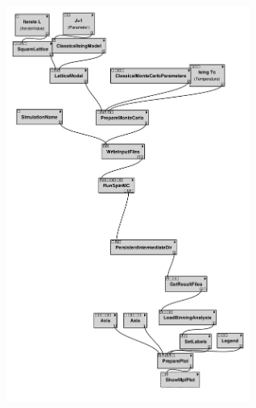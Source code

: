 \href{http://alps.comp-phys.org/vistrails/download.php?getvt=2&db=tutorials&host=alps.ethz.ch&port=3306&tag=&execute=False&showspreadsheetonly=False&version=225}{\includegraphics[width=8cm]{vistrails_images/alps.ethz.ch_tutorials_3306_2_225_pdf_graph/graph_2_225.pdf}
}